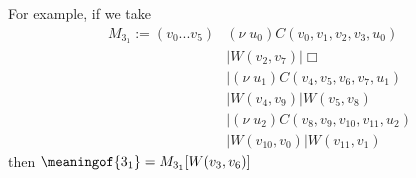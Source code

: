 \begin{example}\label{example:trefoilcontext} For example, if we take
  \begin{align*}
    M_{3_1} := (v_0 ... v_{5}) & (\nu \; u_0)C(v_0,v_1,v_2,v_3,u_0) \\
    & | W(v_2,v_7) | \Box \\
    & | (\nu \; u_1)C(v_4,v_5,v_6,v_7,u_1) \\
    & | W(v_4,v_9) | W(v_5,v_8) \\
    & | (\nu \; u_2)C(v_8,v_9,v_{10},v_{11},u_2) \\
    & | W(v_{10},v_0) | W(v_{11},v_1)
  \end{align*}
then $\meaningof{3_1} = M_{3_1}[W(v_3,v_6)]$
\end{example}

\begin{}
\end{}

